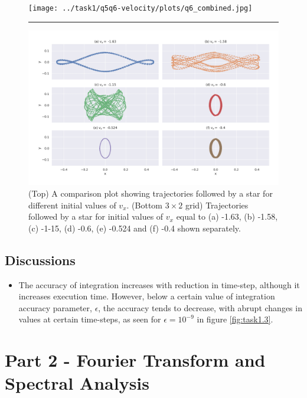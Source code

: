 \documentclass[a4paper]{article}
\begin{document}
\begin{itemize}
			\begin{figure} [h]
				\texttt{[image: ../task1/q5q6-velocity/plots/q6\_combined.jpg]}
				\hrule
				\includegraphics[width=\columnwidth]{../task1/q5q6-velocity/plots/q6_sep.jpg}
				\caption{(Top) A comparison plot showing trajectories followed by a star for different initial values of \(v_x\). (Bottom \(3 \times 2\) grid) Trajectories followed by a star for initial values of \(v_x\) equal to (a) -1.63, (b) -1.58, (c) -1-15, (d) -0.6, (e) -0.524 and (f) -0.4 shown separately.}
				\label{fig:task1.6}
			\end{figure}
		\end{itemize}
		
	
		
		\subsection{Discussions} \label{discussions1}
		
		\begin{itemize}
			\item The accuracy of integration increases with reduction in time-step, although it increases execution time. However, below a certain value of integration accuracy parameter, \(\epsilon\), the accuracy tends to decrease, with abrupt changes in values at certain time-steps, as seen for \(\epsilon=10^{-9}\) in figure \ref{fig:task1.3}.
		\end{itemize}
		
	
	\clearpage
	\section{Part 2 - Fourier Transform and Spectral Analysis} \label{task2}
	
\end{document}
